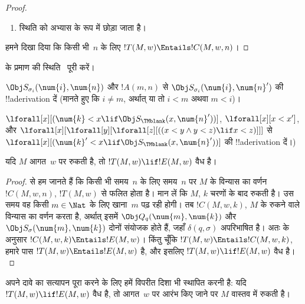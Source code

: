 \documentclass[../../../include/open-logic-section]{subfiles}
\begin{document}
\begin{proof}
\begin{enumerate}
\item स्थिति  को अभ्यास के रूप में छोड़ा जाता है।
\end{enumerate}
हमने दिखा दिया कि किसी भी~$n$ के लिए
$!T(M, w) \Entails !C(M, w, n)$।
\end{proof}

\begin{prob}
 के प्रमाण की
स्थिति~ पूरी करें।
\end{prob}

\begin{prob}
$\Obj S_{\sigma_i}(\num{i}, \num{n})$ और $!A(m, n)$ से
$\Obj S_{\sigma_i}(\num{i}, \num{n}')$ की !!a{derivation} दें (मानते
हुए कि $i \neq m$, अर्थात् या तो $i < m$ अथवा $m < i$)।
\end{prob}

\begin{prob}
$\lforall[x][(\num{k} < x \lif \Obj S_\TMblank(x, \num{n}'))]$,
$\lforall[x][x < x']$, और
$\lforall[x][\lforall[y][\lforall[z][ ((x < y \land y < z) \lif x <
      z)]]]$ से
$\lforall[x][(\num{k}' < x \lif \Obj S_\TMblank(x, \num{n}'))]$ की
!!a{derivation} दें।)
\end{prob}


\begin{lem}
यदि $M$ आगत~$w$ पर रुकती है, तो $!T(M, w) \lif !E(M, w)$ वैध है।
\end{lem}

\begin{proof}
 से हम जानते हैं कि किसी भी समय~$n$ के लिए समय~$n$
पर $M$ के विन्यास का वर्णन~$!C(M, w, n)$, $!T(M, w)$ से फलित होता है।
मान लें कि $M$, $k$ चरणों के बाद रुकती है। उस समय वह किसी
$m \in \Nat$ के लिए खाना~$m$ पढ़ रही होगी। तब $!C(M, w, k)$, $M$ के
रुकने वाले विन्यास का वर्णन करता है, अर्थात् इसमें
$\Obj Q_q(\num{m}, \num{k})$ और $\Obj S_\sigma(\num{m}, \num{k})$
दोनों संयोजक होते हैं, जहाँ $\delta(q,\sigma)$ अपरिभाषित है। अतः
 के अनुसार
$!C(M, w, k) \Entails !E(M, w)$। किंतु चूँकि
$!T(M, w) \Entails !C(M, w, k)$, हमारे पास
$!T(M, w) \Entails !E(M, w)$ है, और इसलिए
$!T(M, w) \lif !E(M, w)$ वैध है।
\end{proof}


\begin{explain}
अपने दावे का सत्यापन पूरा करने के लिए हमें विपरीत दिशा भी स्थापित करनी
है: यदि $!T(M, w) \lif !E(M, w)$ वैध है, तो आगत~$w$ पर आरंभ किए जाने
पर $M$ वास्तव में रुकती है।
\end{explain}
\end{document}
